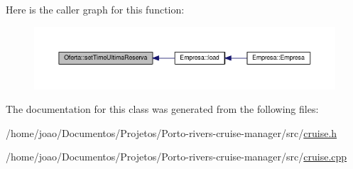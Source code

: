 Here is the caller graph for this function\+:
\nopagebreak
\begin{figure}[H]
\begin{center}
\leavevmode
\includegraphics[width=350pt]{classOferta_a50c041d2301a351f2ac69ed235175116_icgraph}
\end{center}
\end{figure}




The documentation for this class was generated from the following files\+:\begin{DoxyCompactItemize}
\item 
/home/joao/\+Documentos/\+Projetos/\+Porto-\/rivers-\/cruise-\/manager/src/\hyperlink{cruise_8h}{cruise.\+h}\item 
/home/joao/\+Documentos/\+Projetos/\+Porto-\/rivers-\/cruise-\/manager/src/\hyperlink{cruise_8cpp}{cruise.\+cpp}\end{DoxyCompactItemize}
